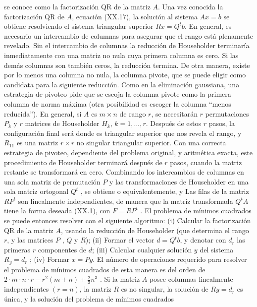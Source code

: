 \documentclass[twocolumn,twoside]{article}
\begin{document}
se conoce como la factorización QR de la matriz $A$.
Una vez conocida la factorización QR de $A$, ecuación (XX.17), la solución al sistema
$A x = b$ se obtiene resolviendo el sistema triangular superior $R x = Q^t b$.
En general, es necesario un intercambio de columnas para asegurar que el rango
está plenamente revelado. Sin el intercambio de columnas la reducción de Householder
terminar\'ia inmediatamente con una matriz no nula cuya primera columna es cero. Si las
demás columnas son también ceros, la reducción termina. De otra manera, existe por
lo menos una columna no nula, la columna pivote, que se puede eligir como candidata
para la siguiente reducción. Como en la eliminación gaussiana, una estrategia de pivoteo
pide que se escoja la columna pivote como la primera columna de norma máxima (otra
posibilidad es escoger la columna “menos reducida”).
En general, si $A$ es $m\times n$ de rango $r$, se necesitarán $r$ permutaciones ${P_k}$ y $r$
matrices de Householder ${H_k}$, $k = 1, . . . , r$. Después de estos $r$ pasos, la configuración
final será
donde
es triangular superior que nos revela el rango, y $R_{11}$ es una matriz $ r\times r$ no singular
triangular superior. Con una correcta estrategia de pivoteo, dependiente del problema
original, y aritmética exacta, este procedimiento de Householder terminará después de $r$
pasos, cuando la matriz restante se transformará en cero. Combinando los intercambios
de columnas en una sola matriz de permutación $P$ y las transformaciones de Householder
en una sola matriz ortogonal $Q^t$ , se obtiene
o equivalentemente,
y 
Las filas de la matriz $R P^t$ son linealmente independientes, de manera que la matriz
transformada $Q^t A$ tiene la forma deseada (XX.1), con $F = R P^t$ . El problema de
m\'inimos cuadrados se puede entonces resolver con el siguiente algoritmo:
(i) Calcular la factorización QR de la matriz $A$, usando la reducción de Householder (que
determina el rango $r$, y las matrices $P$ , $Q$ y $R$);
(ii) Formar el vector $d = Q^t b$, y denotar con $d_r$ las primeras $r$ componentes de $d$;
(iii) Calcular cualquier solución $y$ del sistema $R_y = d_r$ ;
(iv) Formar $x = Py$.
El número de operaciones requerido para resolver el problema de m\'inimos cuadrados
de esta manera es del orden de $2\cdot m\cdot n\cdot r - r^2 (m + n) + \frac{2}{3} n^3$ .
Si la matriz $A$ posee columnas linealmente independientes $(r = n)$, la matriz $R$ es no
singular, la solución de $Ry = d_r$ es única, y la solución del problema de m\'inimos cuadrados 
\end{document}
